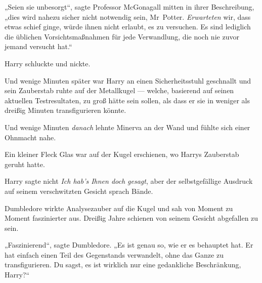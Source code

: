 „Seien sie unbesorgt“, sagte Professor McGonagall mitten in ihrer Beschreibung, „dies wird nahezu sicher nicht notwendig sein, Mr~Potter. \emph{Erwarteten} wir, dass etwas schief ginge, würde ihnen nicht erlaubt, es zu versuchen. Es sind lediglich die üblichen Vorsichtsmaßnahmen für jede Verwandlung, die noch nie zuvor jemand versucht hat.“

Harry schluckte und nickte.

Und wenige Minuten später war Harry an einen Sicherheitsstuhl geschnallt und sein Zauberstab ruhte auf der Metallkugel — welche, basierend auf seinen aktuellen Testresultaten, zu groß hätte sein sollen, als dass er sie in weniger als dreißig Minuten transfigurieren könnte.

Und wenige Minuten \emph{danach} lehnte Minerva an der Wand und fühlte sich einer Ohnmacht nahe.

Ein kleiner Fleck Glas war auf der Kugel erschienen, wo Harrys Zauberstab geruht hatte.

Harry sagte nicht \emph{Ich hab’s Ihnen doch gesagt}, aber der selbstgefällige Ausdruck auf seinem verschwitzten Gesicht sprach Bände.

Dumbledore wirkte Analysezauber auf die Kugel und sah von Moment zu Moment faszinierter aus. Dreißig Jahre schienen von seinem Gesicht abgefallen zu sein.

„Faszinierend“, sagte Dumbledore.
„Es ist genau so, wie er es behauptet hat. Er hat einfach einen Teil des Gegenstands verwandelt, ohne das Ganze zu transfigurieren. Du sagst, es ist wirklich nur eine gedankliche Beschränkung, Harry?“

